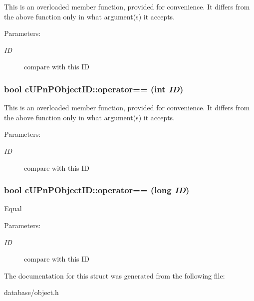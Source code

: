 This is an overloaded member function, provided for convenience. It differs from the above function only in what argument(s) it accepts. \begin{Desc}
\item[Parameters:]
\begin{description}
\item[{\em ID}]compare with this ID \end{description}
\end{Desc}
\hypertarget{structcUPnPObjectID_18cf7d50a8ae1b6d2034e88fef78e23f}{
\subsubsection[{operator==}]{\setlength{\rightskip}{0pt plus 5cm}bool cUPnPObjectID::operator== (int {\em ID})}}
\label{structcUPnPObjectID_18cf7d50a8ae1b6d2034e88fef78e23f}


This is an overloaded member function, provided for convenience. It differs from the above function only in what argument(s) it accepts. \begin{Desc}
\item[Parameters:]
\begin{description}
\item[{\em ID}]compare with this ID \end{description}
\end{Desc}
\hypertarget{structcUPnPObjectID_b612ccd98af29996a4ac15cdbf01320f}{
\subsubsection[{operator==}]{\setlength{\rightskip}{0pt plus 5cm}bool cUPnPObjectID::operator== (long {\em ID})}}
\label{structcUPnPObjectID_b612ccd98af29996a4ac15cdbf01320f}


Equal \begin{Desc}
\item[Parameters:]
\begin{description}
\item[{\em ID}]compare with this ID \end{description}
\end{Desc}


The documentation for this struct was generated from the following file:\begin{CompactItemize}
\item 
database/object.h\end{CompactItemize}
